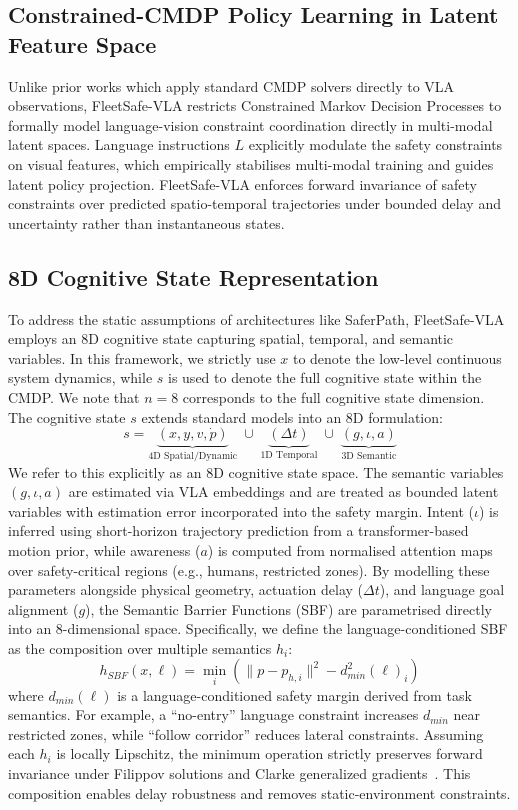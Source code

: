 \documentclass[10pt,twocolumn]{article}
\begin{document}
\subsection{Constrained-CMDP Policy Learning in Latent Feature Space}
Unlike prior works which apply standard CMDP solvers directly to VLA observations, FleetSafe-VLA restricts Constrained Markov Decision Processes to formally model language-vision constraint coordination directly in multi-modal latent spaces. Language instructions $L$ explicitly modulate the safety constraints on visual features, which empirically stabilises multi-modal training and guides latent policy projection. FleetSafe-VLA enforces forward invariance of safety constraints over predicted spatio-temporal trajectories under bounded delay and uncertainty rather than instantaneous states.

\subsection{8D Cognitive State Representation}
To address the static assumptions of architectures like SaferPath, FleetSafe-VLA employs an 8D cognitive state capturing spatial, temporal, and semantic variables. In this framework, we strictly use $x$ to denote the low-level continuous system dynamics, while $s$ is used to denote the full cognitive state within the CMDP. We note that $n = 8$ corresponds to the full cognitive state dimension. The cognitive state $s$ extends standard models into an 8D formulation:
\begin{equation}
s = \underbrace{(x, y, v, \dot{p})}_{\text{4D Spatial/Dynamic}} \;\cup\; \underbrace{(\Delta t)}_{\text{1D Temporal}} \;\cup\; \underbrace{(g, \iota, a)}_{\text{3D Semantic}}
\end{equation}
We refer to this explicitly as an 8D cognitive state space. The semantic variables $(g, \iota, a)$ are estimated via VLA embeddings and are treated as bounded latent variables with estimation error incorporated into the safety margin.
Intent ($\iota$) is inferred using short-horizon trajectory prediction from a transformer-based motion prior, while awareness ($a$) is computed from normalised attention maps over safety-critical regions (e.g., humans, restricted zones). By modelling these parameters alongside physical geometry, actuation delay ($\Delta t$), and language goal alignment ($g$), the Semantic Barrier Functions (SBF) are parametrised directly into an 8-dimensional space. Specifically, we define the language-conditioned SBF as the composition over multiple semantics $h_i$:
\begin{equation}
h_{SBF}(x, \ell) = \min_i \left( \|p - p_{h,i}\|^2 - d_{min}^2(\ell)_i \right)
\end{equation}
where $d_{min}(\ell)$ is a language-conditioned safety margin derived from task semantics. For example, a ``no-entry'' language constraint increases $d_{min}$ near restricted zones, while ``follow corridor'' reduces lateral constraints. Assuming each $h_i$ is locally Lipschitz, the minimum operation strictly preserves forward invariance under Filippov solutions and Clarke generalized gradients~\cite{clarke1990nonsmooth}. This composition enables delay robustness and removes static-environment constraints.
\end{document}
